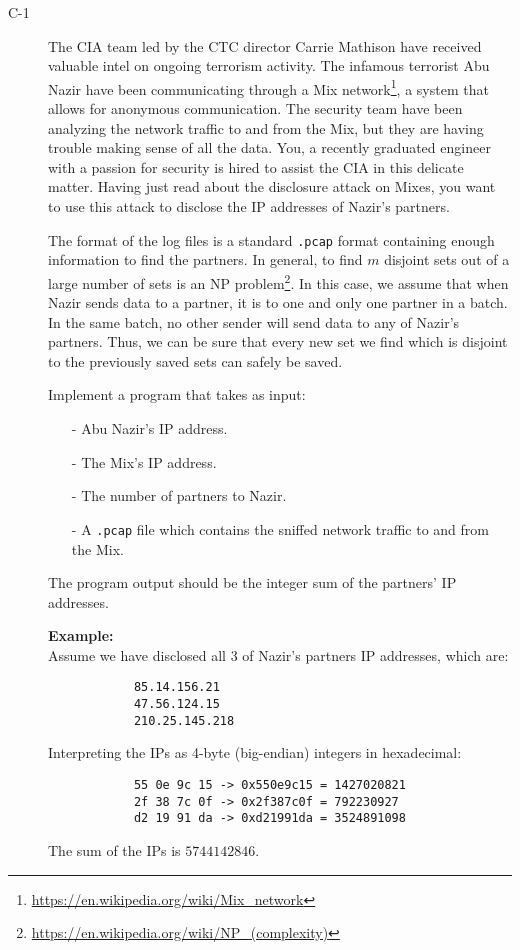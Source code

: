 \documentclass{article}
\begin{document}
\begin{description}
	\item[C-1]{The CIA team led by the CTC director Carrie Mathison have received valuable intel on ongoing terrorism activity.
		The infamous terrorist Abu Nazir have been communicating through a Mix network\footnote{\url{https://en.wikipedia.org/wiki/Mix_network}}, 
		a system that allows for anonymous communication. The security team have been analyzing the network traffic to and from the Mix, but
		they are having trouble making sense of all the data. You, a recently graduated engineer with a passion for security is hired to assist
		the CIA in this delicate matter. Having just read about the disclosure attack on Mixes, you want to use this attack to disclose the
		IP addresses of Nazir's partners. 
		
		The format of the log files is a standard \texttt{.pcap} format containing enough information
		to find the partners. In general, to find $m$ disjoint sets out of a large number of sets is an 
		NP problem\footnote{\url{https://en.wikipedia.org/wiki/NP_(complexity)}}. In this case, we assume that when Nazir sends data to a partner,
		it is to one and only one partner in a batch. In the same batch, no other sender will send data to any of Nazir's partners. Thus,
		we can be sure that every new set we find which is disjoint to the previously saved sets can safely be saved.

		Implement a program that takes as input:
		\begin{itemize}
			\item[-] Abu Nazir's IP address.
			\item[-] The Mix's IP address.
			\item[-] The number of partners to Nazir.
			\item[-] A \texttt{.pcap} file which contains the sniffed network traffic to and from the Mix.
		\end{itemize}
		The program output should be the integer sum of the partners' IP addresses.

		\textbf{Example:}\\
		Assume we have disclosed all 3 of Nazir's partners IP addresses, which are:
		\begin{verbatim}
			85.14.156.21
			47.56.124.15
			210.25.145.218
		\end{verbatim}
		Interpreting the IPs as 4-byte (big-endian) integers in hexadecimal:
		\begin{verbatim}
			55 0e 9c 15 -> 0x550e9c15 = 1427020821
			2f 38 7c 0f -> 0x2f387c0f = 792230927
			d2 19 91 da -> 0xd21991da = 3524891098
		\end{verbatim}
		The sum of the IPs is $5744142846$.

}
\end{description}
\end{document}
